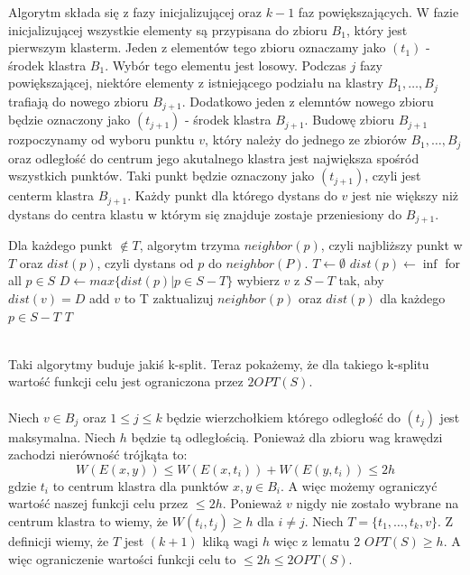 \noindent
Algorytm składa się z fazy inicjalizującej oraz $k-1$ faz powiększających.
W fazie inicjalizującej wszystkie elementy są przypisana do zbioru $B_{1}$, który jest pierwszym klasterm.
Jeden z elementów tego zbioru oznaczamy jako $(t_{1})$ - środek klastra $B_{1}$.
Wybór tego elementu jest losowy.
Podczas $j$ fazy powiększającej, niektóre elementy z istniejącego podziału na klastry $B_{1}, \dots, B_{j}$ trafiają do nowego zbioru $B_{j+1}$.
Dodatkowo jeden z elemntów nowego zbioru będzie oznaczony jako $(t_{j+1})$ - środek klastra $B_{j+1}$.
Budowę zbioru $B_{j+1}$ rozpoczynamy od wyboru punktu $v$, który należy do jednego ze zbiorów $B_{1}, \dots, B_{j}$ oraz odległość do centrum jego akutalnego klastra jest największa spośród wszystkich punktów. 
Taki punkt będzie oznaczony jako $(t_{j+1})$, czyli jest centerm klastra $B_{j+1}$.
Każdy punkt dla którego dystans do $v$ jest nie większy niż dystans do centra klastu w którym się znajduje zostaje przeniesiony do $B_{j+1}$.
\begin{algorithm}
    \caption{}
\begin{algorithmic}
    \State Dla każdego punkt $\notin T$, algorytm trzyma $neighbor(p)$, czyli najbliższy punkt w $T$ oraz $dist(p)$, czyli dystans od $p$ do $neighbor(P)$.
        \State $T \leftarrow \emptyset$
        \State $dist(p) \leftarrow \inf$ for all $p \in S$
            \State $D \leftarrow max\{dist(p) | p \in S-T\}$
            \State wybierz $v$ z $S-T$ tak, aby $dist(v) = D$
            \State add $v$ to T
            \State zaktualizuj $neighbor(p)$ oraz $dist(p)$ dla każdego $p \in S-T$
        \EndWhile
    \EndProcedure
    \Return $T$
\end{algorithmic}
\end{algorithm}
\\
Taki algorytmy buduje jakiś k-split.
Teraz pokażemy, że dla takiego k-splitu wartość funkcji celu jest ograniczona przez $2OPT(S)$.
\\~\\
Niech $v \in B_{j}$ oraz $1 \leq j \leq k$ będzie wierzchołkiem którego odległość do $(t_{j})$ jest maksymalna.
Niech $h$ będzie tą odległością.
Ponieważ dla zbioru wag krawędzi zachodzi nierówność trójkąta to:
\begin{equation}
    W(E(x, y)) \leq W(E(x, t_{i})) + W(E(y, t_{i})) \leq 2h
\end{equation}
gdzie $t_{i}$ to centrum klastra dla punktów $x, y \in B_{i}$.
A więc możemy ograniczyć wartość naszej funkcji celu przez $\leq 2h$.
Ponieważ $v$ nigdy nie zostało wybrane na centrum klastra to wiemy, że $W(t_{i}, t_{j}) \geq h$ dla $i \neq j$.
Niech $T = \{ t_{1}, \dots, t_{k}, v \}$.
Z definicji wiemy, że $T$ jest $(k+1)$ kliką wagi $h$ więc z lematu 2 $OPT(S) \geq h$.
A więc ograniczenie wartości funkcji celu to $\leq 2h \leq 2OPT(S)$.